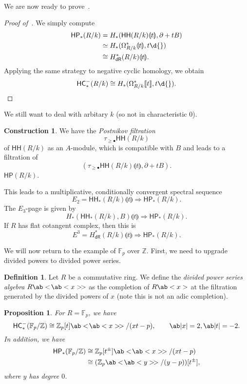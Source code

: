 \documentclass[10pt, oneside]{memoir}
\newtheorem{prop}[thm]{Proposition}
\theoremstyle{definition}
\newtheorem{defn}[thm]{Definition}
\newtheorem{con}[thm]{Construction}
\theoremstyle{remark}
\theoremstyle{plain}
\theoremstyle{definition}
\theoremstyle{remark}
\newcommand{\Z}{\mathbb{Z}}
\newcommand{\F}{\mathbb{F}}
\newcommand{\ms}[1]{\mathsf{#1}}
\newcommand{\1}{\mathbf{1}}
\newcommand{\2}{\mathbf{2}}
\newcommand{\3}{\mathbf{3}}
\newcommand{\ps}[1]{\llbracket #1 \rrbracket}
\newcommand{\ls}[1]{\llparenthesis #1 \rrparenthesis}
\newcommand{\dps}[1]{\ab<\!\ab< #1 >\!>}
\newcommand{\HC}{\ms{HC}}
\newcommand{\HH}{\ms{HH}}
\newcommand{\HP}{\ms{HP}}
\newcommand{\dR}{\ms{dR}}
\begin{document}
We are now ready to prove~.
\begin{proof}[Proof of~]
    We simply compute
    \begin{align*}
        \HP_*(R/k) &= H_*(\HH(R/k)\ls{t}, \partial + tB) \\
        &\simeq H_*(\Omega^*_{R/k} \ls{t}, t\d{}) \\
        &\cong H^*_{\dR}(R/k) \ls{t}.
    \end{align*}
    Applying the same strategy to negative cyclic homology, we obtain
    \[ \HC_*^-(R/k) \cong H_*(\Omega^*_{R/k}\ps{t}, t\d{}). \qedhere \]
\end{proof}

We still want to deal with arbitary $k$ (so not in characteristic $0$). 
\begin{con}
    We have the \textit{Postnikov filtration}
    \[ \tau_{\geq \bullet} \HH(R/k) \]
    of $\HH(R/k)$ as an $A$-module, which is compatible with $B$ and leads to a filtration of
    \[ (\tau_{\geq \bullet} \HH(R/k)\ls{t}, \partial + tB). \]
    $\HP(R/k)$. 
\end{con}

This leads to a multiplicative, conditionally convergent spectral sequence
\[ E_2 = \HH_*(R/k) \ls{t} \Longrightarrow \HP_*(R/k). \]
The $E_3$-page is given by
\[ H_*(\HH_*(R/k), B)\ls{t} \Longrightarrow \HP_*(R/k). \]
If $R$ has flat cotangent complex, then this is
\[ E^3 = H^*_{\dR}(R/k)\ls{t} \Longrightarrow \HP_*(R/k). \]

We will now return to the example of $\F_p$ over $\Z$. First, we need to upgrade divided powers to divided power series.

\begin{defn}
    Let $R$ be a commutative ring. We define the \textit{divided power series algebra} $R \ab<\!\ab<x>\!>$ as the completion of $R\ab<x>$ at the filtration generated by the divided powers of $x$ (note this is not an adic completion).
\end{defn}

\begin{prop}
    For $R = \F_p$, we have
    \[ \HC_*^-(\F_p/\Z) \cong \Z_p[t]\dps{x} / (xt-p), \qquad \ab|x|=2, \ab|t|=-2. \]
    In addition, we have
    \begin{align*}
        \HP_*(\F_p/\Z) &\cong \Z_p[t^{\pm}] \dps{x} / (xt-p)  \\
        &\cong (\Z_p \dps{y}/(y-p) )[ t^{\pm}],
    \end{align*}
    where $y$ has degree $0$.
\end{prop}
\end{document}
